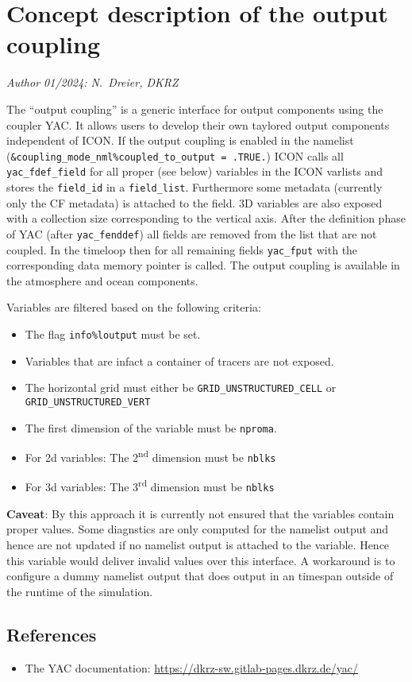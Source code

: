 \documentclass{article}
\begin{document}
\section*{Concept description of the output coupling}
\textit{Author 01/2024: N.\ Dreier, DKRZ}

The ``output coupling'' is a generic interface for output components
using the coupler YAC.
It allows users to develop their own taylored output components
independent of ICON.
If the output coupling is enabled in the namelist
\mbox{(\texttt{\&coupling\_mode\_nml\%coupled\_to\_output = .TRUE.})}
ICON calls all \mbox{\texttt{yac\_fdef\_field}} for all proper (see below)
variables in the ICON varlists and stores the \texttt{field\_id} in a
\texttt{field\_list}.
Furthermore some metadata (currently only the CF metadata) is attached
to the field.
3D variables are also exposed with a collection size corresponding to
the vertical axis.
After the definition phase of YAC (after \mbox{\texttt{yac\_fenddef}})
all fields are removed from the list that are not coupled.
In the timeloop then for all remaining fields \texttt{yac\_fput} with
the corresponding data memory pointer is called.
The output coupling is available in the atmosphere and ocean components.

Variables are filtered based on the following criteria:
\begin{itemize}
\item The flag \texttt{info\%loutput} must be set.
\item Variables that are infact a container of tracers are not exposed.
\item The horizontal grid must either be \mbox{\texttt{GRID\_UNSTRUCTURED\_CELL}} or \mbox{\texttt{GRID\_UNSTRUCTURED\_VERT}}
\item The first dimension of the variable must be \texttt{nproma}.
\item For 2d variables: The 2\textsuperscript{nd} dimension must be \texttt{nblks}
\item For 3d variables: The 3\textsuperscript{rd} dimension must be \texttt{nblks}
\end{itemize}

\textbf{Caveat}: By this approach it is currently not ensured that the
variables contain proper values. Some diagnstics are only computed for
the namelist output and hence are not updated if no namelist output is
attached to the variable. Hence this variable would deliver invalid
values over this interface. A workaround is to configure a dummy
namelist output that does output in an timespan outside of the runtime
of the simulation.

\subsection*{References}
\begin{itemize}
\item The YAC documentation: \url{https://dkrz-sw.gitlab-pages.dkrz.de/yac/}
\end{itemize}
\end{document}
